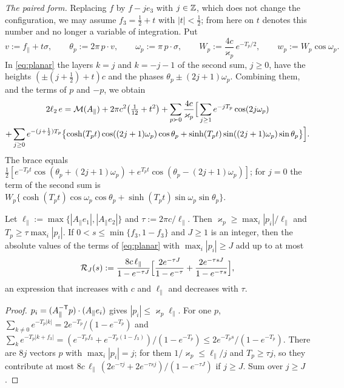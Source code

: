 \emph{The paired form.} Replacing $f$ by $f-je_3$ with $j\in\mathbb Z$, which does not change the configuration, we may assume
$f_3=\frac12+t$ with $|t|<\frac12$; from here on $t$ denotes this number and no longer a variable of integration. Put
\begin{equation}\label{eq:det-pnot}
  v:=f_\parallel+t\sigma,\qquad\theta_p:=2\pi\,p\cdot v,\qquad\omega_p:=\pi\,p\cdot\sigma,\qquad
  W_p:=\frac{4c}{\varkappa_p}\,e^{-T_p/2},\qquad w_p:=W_p\cos\omega_p .
\end{equation}
In \eqref{eq:planar} the layers $k=j$ and $k=-j-1$ of the second sum, $j\ge0$, have the heights $(\pm(j+\frac12)+t)c$ and the phases
$\theta_p\pm(2j+1)\omega_p$. Combining them, and the terms of $p$ and $-p$, we obtain
\begin{multline}\label{eq:det-paired}
  2\ell_2\,e=\mathcal M(A_\parallel)+2\pi c^2\bigl(\tfrac1{12}+t^2\bigr)+\sum_{p\succ0}\frac{4c}{\varkappa_p}\Bigl[\,\sum_{j\ge1}e^{-jT_p}\cos(2j\omega_p)\\
   +\sum_{j\ge0}e^{-(j+\frac12)T_p}\bigl\{\cosh(T_pt)\cos((2j+1)\omega_p)\cos\theta_p+\sinh(T_pt)\sin((2j+1)\omega_p)\sin\theta_p\bigr\}\Bigr].
\end{multline}
The brace equals $\frac12[e^{-T_pt}\cos(\theta_p+(2j+1)\omega_p)+e^{T_pt}\cos(\theta_p-(2j+1)\omega_p)]$; for $j=0$ the term of the
second sum is $W_p\{\cosh(T_pt)\cos\omega_p\cos\theta_p+\sinh(T_pt)\sin\omega_p\sin\theta_p\}$.

\begin{lemma}\label{lem:det-ptail}
Let $\ell_\parallel:=\max\{|A_\parallel e_1|,|A_\parallel e_2|\}$ and $\tau:=2\pi c/\ell_\parallel$. Then
$\varkappa_p\ge\max_i|p_i|/\ell_\parallel$ and $T_p\ge\tau\max_i|p_i|$. If $0<s\le\min\{f_3,1-f_3\}$ and $J\ge1$ is an integer, then
the absolute values of the terms of \eqref{eq:planar} with $\max_i|p_i|\ge J$ add up to at most
\[
  \mathcal R_J(s):=\frac{8c\,\ell_\parallel}{1-e^{-\tau J}}\Bigl[\frac{2e^{-\tau J}}{1-e^{-\tau}}+\frac{2e^{-\tau sJ}}{1-e^{-\tau s}}\Bigr],
\]
an expression that increases with $c$ and $\ell_\parallel$ and decreases with $\tau$.
\end{lemma}

\begin{proof}
$p_i=(A_\parallel^{-\mathsf T}p)\cdot(A_\parallel e_i)$ gives $|p_i|\le\varkappa_p\ell_\parallel$. For one $p$,
$\sum_{k\ne0}e^{-T_p|k|}=2e^{-T_p}/(1-e^{-T_p})$ and
$\sum_ke^{-T_p|k+f_3|}=(e^{-T_pf_3}+e^{-T_p(1-f_3)})/(1-e^{-T_p})\le2e^{-T_ps}/(1-e^{-T_p})$. There are $8j$ vectors $p$ with
$\max_i|p_i|=j$; for them $1/\varkappa_p\le\ell_\parallel/j$ and $T_p\ge\tau j$, so they contribute at most
$8c\,\ell_\parallel\,(2e^{-\tau j}+2e^{-\tau sj})/(1-e^{-\tau J})$ if $j\ge J$. Sum over $j\ge J$.
\end{proof}

